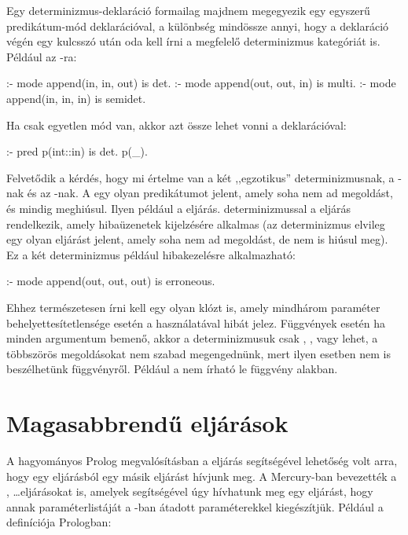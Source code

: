 Egy determinizmus-deklaráció formailag majdnem megegyezik egy egyszerű predikátum-mód
deklarációval, a különbség mindössze annyi, hogy a deklaráció végén egy  kulcsszó
után oda kell írni a megfelelő determinizmus kategóriát is. Például az -ra:

\begin{prologcode}
:- mode append(in, in, out) is det.
:- mode append(out, out, in) is multi.
:- mode append(in, in, in) is semidet.
\end{prologcode}

Ha csak egyetlen mód van, akkor azt össze lehet vonni a  deklarációval:

\begin{prologcode}
:- pred p(int::in) is det.
p(_).
\end{prologcode}

Felvetődik a kérdés, hogy mi értelme van a két ,,egzotikus'' determinizmusnak, a
-nak és az -nak. A  egy olyan predikátumot
jelent, amely soha nem ad megoldást, és mindig meghiúsul. Ilyen például a 
eljárás.  determinizmussal a  eljárás rendelkezik,
amely hibaüzenetek kijelzésére alkalmas (az  determinizmus elvileg egy
olyan eljárást jelent, amely soha nem ad megoldást, de nem is hiúsul meg). Ez a két
determinizmus például hibakezelésre alkalmazható:

\begin{prologcode}
:- mode append(out, out, out) is erroneous.
\end{prologcode}

Ehhez természetesen írni kell egy olyan klózt is, amely mindhárom paraméter
behelyettesítetlensége esetén a  használatával hibát jelez.
\br
Függvények esetén ha minden argumentum bemenő, akkor a determinizmusuk csak
, ,  vagy  lehet, a többszörös
megoldásokat nem szabad megengednünk, mert ilyen esetben nem is beszélhetünk
függvényről. Például a  nem írható le függvény alakban.


\section{Magasabbrendű eljárások}

A hagyományos Prolog megvalósításban a  eljárás segítségével lehetőség
volt arra, hogy egy eljárásból egy másik eljárást hívjunk meg. A Mercury-ban
bevezették a ,  \ldots eljárásokat is, amelyek segítségével
úgy hívhatunk meg egy eljárást, hogy annak paraméterlistáját a -ban
átadott paraméterekkel kiegészítjük. Például a  definíciója Prologban:

